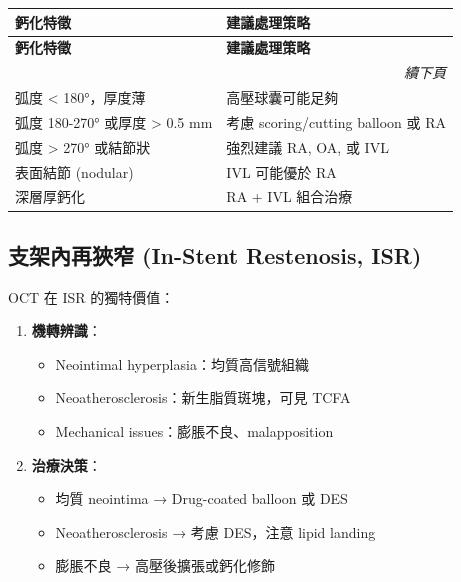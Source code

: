 \documentclass[12pt,a4paper]{article}
\begin{document}
\begin{longtable}{p{5cm}p{9cm}}
\toprule
\textbf{鈣化特徵} & \textbf{建議處理策略} \\
\midrule
\endfirsthead
\toprule
\textbf{鈣化特徵} & \textbf{建議處理策略} \\
\midrule
\endhead
\midrule
\multicolumn{2}{r}{\textit{續下頁}} \\
\endfoot
\bottomrule
\endlastfoot

弧度 < 180°，厚度薄 & 高壓球囊可能足夠 \\

弧度 180-270° 或厚度 > 0.5 mm & 考慮 scoring/cutting balloon 或 RA \\

弧度 > 270° 或結節狀 & 強烈建議 RA, OA, 或 IVL \\

表面結節 (nodular) & IVL 可能優於 RA \\

深層厚鈣化 & RA + IVL 組合治療 \\

\end{longtable}


\subsection{支架內再狹窄 (In-Stent Restenosis, ISR)}

OCT 在 ISR 的獨特價值：

\begin{enumerate}
    \item \textbf{機轉辨識}：
    \begin{itemize}
        \item Neointimal hyperplasia：均質高信號組織
        \item Neoatherosclerosis：新生脂質斑塊，可見 TCFA
        \item Mechanical issues：膨脹不良、malapposition
    \end{itemize}

    \item \textbf{治療決策}：
    \begin{itemize}
        \item 均質 neointima → Drug-coated balloon 或 DES
        \item Neoatherosclerosis → 考慮 DES，注意 lipid landing
        \item 膨脹不良 → 高壓後擴張或鈣化修飾
    \end{itemize}
\end{enumerate}
\end{document}
